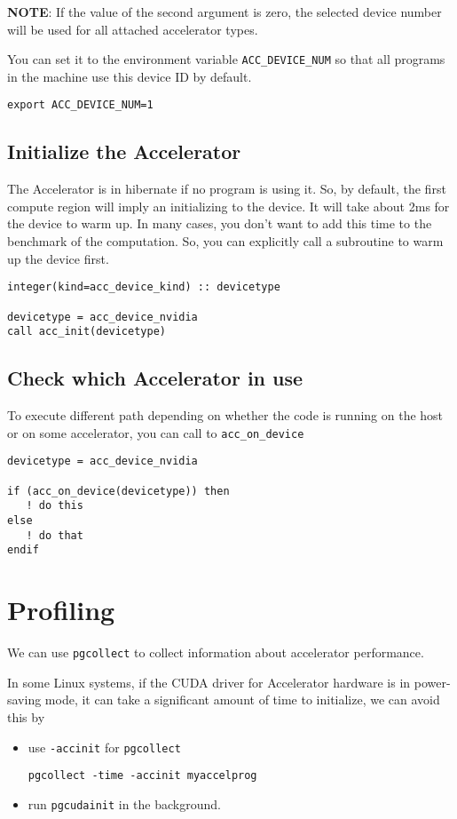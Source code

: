 {\bf NOTE}: If the value of the second argument is zero, the selected
device number will be used for all attached accelerator types.

You can set it to the environment variable \verb!ACC_DEVICE_NUM! so
that all programs in the machine use this device ID by default.
\begin{verbatim}
export ACC_DEVICE_NUM=1
\end{verbatim}

\subsection{Initialize the Accelerator}
\label{sec:init-accel}

The Accelerator is in hibernate if no program is using it. So, by
default, the first compute region will imply an initializing to the
device. It will take about 2ms for the device to warm up. In many
cases, you don't want to add this time to the benchmark of the
computation. So, you can explicitly call a subroutine to warm up the
device first. 

\begin{lstlisting}
integer(kind=acc_device_kind) :: devicetype

devicetype = acc_device_nvidia
call acc_init(devicetype)
\end{lstlisting}

\subsection{Check which Accelerator in use}
\label{sec:check-which-accel}

To execute different path depending on whether the code is running on
the host or on some accelerator, you can call to \verb!acc_on_device!

\begin{lstlisting}
devicetype = acc_device_nvidia

if (acc_on_device(devicetype)) then
   ! do this
else
   ! do that
endif
\end{lstlisting}

\section{Profiling }
\label{sec:profiling-}

We can use \verb!pgcollect! to collect information about accelerator
performance.

In some Linux systems, if the CUDA driver for Accelerator hardware is
in power-saving mode, it can take a significant amount of time to
initialize, we can avoid this by
\begin{itemize}
\item use \verb!-accinit! for \verb!pgcollect!
\begin{verbatim}
pgcollect -time -accinit myaccelprog
\end{verbatim}

\item run \verb!pgcudainit! in the background.
\end{itemize}

